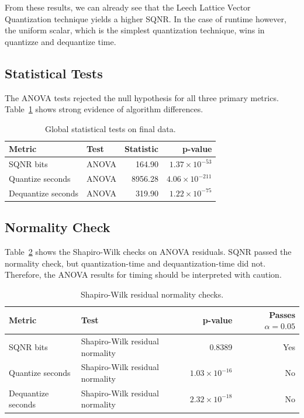 \documentclass[11pt]{article}
\begin{document}
From these results, we can already see that the Leech Lattice Vector Quantization technique yields a higher SQNR. In the case of runtime however, the uniform scalar, which is
the simplest quantization technique, wins in quantizze and dequantize time.

\subsection{Statistical Tests}

The ANOVA tests rejected the null hypothesis for all three primary metrics. Table~\ref{tab:globaltests} shows strong evidence of algorithm differences.

\begin{table}[H]
\centering
\caption{Global statistical tests on final data.}
\label{tab:globaltests}
\begin{tabular}{llrr}
\toprule
Metric & Test & Statistic & p-value \\
\midrule
SQNR bits & ANOVA & 164.90 & $1.37 \times 10^{-53}$ \\
Quantize seconds & ANOVA & 8956.28 & $4.06 \times 10^{-211}$ \\
Dequantize seconds & ANOVA & 319.90 & $1.22 \times 10^{-75}$ \\
\bottomrule
\end{tabular}
\end{table}

\subsection{Normality Check}

Table~\ref{tab:assumptions} shows the Shapiro-Wilk checks on ANOVA residuals. SQNR passed the normality check, but quantization-time and dequantization-time did not.
Therefore, the ANOVA results for timing should be interpreted with caution.

\begin{table}[H]
\centering
\caption{Shapiro-Wilk residual normality checks.}
\label{tab:assumptions}
\begin{tabular}{llrr}
\toprule
Metric & Test & p-value & Passes $\alpha=0.05$ \\
\midrule
SQNR bits & Shapiro-Wilk residual normality & 0.8389 & Yes \\
Quantize seconds & Shapiro-Wilk residual normality & $1.03 \times 10^{-16}$ & No \\
Dequantize seconds & Shapiro-Wilk residual normality & $2.32 \times 10^{-18}$ & No \\
\bottomrule
\end{tabular}
\end{table}
\end{document}
